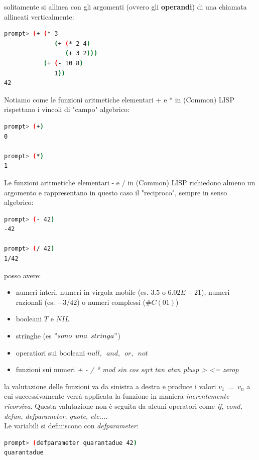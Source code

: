 \documentclass[a4paper,12pt, oneside]{book}
\begin{document}
solitamente si allinea con gli argomenti (ovvero gli \textbf{operandi}) di una chiamata allineati verticalmente:
\begin{shaded}
	\begin{lstlisting}[language=bash]
prompt> (+ (* 3
              (+ (* 2 4)
                 (+ 3 2)))
           (+ (- 10 8)
              1))
42
\end{lstlisting}
\end{shaded}
Notiamo come le funzioni aritmetiche elementari + e * in (Common) LISP
rispettano i vincoli di "campo" algebrico:
\begin{shaded}
	\begin{lstlisting}[language=bash]
prompt> (+)
0

prompt> (*)
1
\end{lstlisting}
\end{shaded}
Le funzioni aritmetiche elementari - e / in (Common) LISP richiedono almeno
un argomento e rappresentano in questo caso il "reciproco", sempre in senso
algebrico:
\begin{shaded}
	\begin{lstlisting}[language=bash]
prompt> (- 42)
-42

prompt> (/ 42)
1/42
\end{lstlisting}
\end{shaded}
posso avere:
\begin{itemize}
	\item numeri interi, numeri in virgola mobile (es. $3.5$ o $6.02E+21$), numeri razionali (es. $-3/42$) o numeri complessi ($\#C (0 1)$)
	\item booleani $T$ e $NIL$
	\item stringhe (es $"sono\,\,\, una \,\,\,stringa"$)
	\item operatiori sui booleani $null,\,\,\,and,\,\,\, or,\,\,\,not$
	\item funzioni sui numeri \textit{+ - / * mod sin cos sqrt tan atan plusp > <= zerop}
\end{itemize}
la valutazione delle funzioni va da sinistra a destra e produce i valori $v_1\,\,\,...\,\,\, v_n$ a cui successivamente verrà applicata la funzione in maniera \textit{inerentemente ricorsiva}. Questa valutazione non è seguita da alcuni operatori come \textit{if, cond, defun, defparameter, quote, etc...}.\\
Le variabili si definiscono con \textit{defparameter}:
\begin{shaded}
	\begin{lstlisting}[language=bash]
prompt> (defparameter quarantadue 42)
quarantadue
\end{lstlisting}
\end{shaded}
\end{document}
